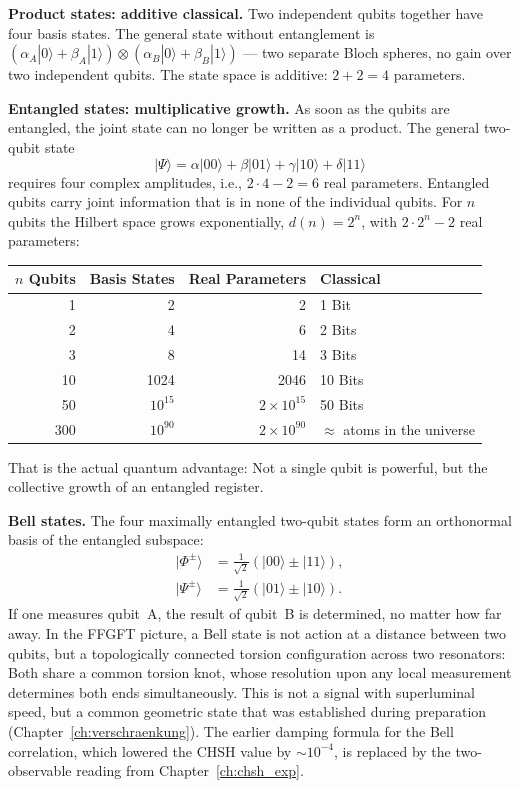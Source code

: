 \textbf{Product states: additive classical.} Two independent qubits
together have four basis states. The general state without
entanglement is $(\alpha_A|0\rangle+\beta_A|1\rangle)\otimes
(\alpha_B|0\rangle+\beta_B|1\rangle)$ --- two separate Bloch spheres,
no gain over two independent qubits. The state space is additive:
$2+2 = 4$ parameters.

\textbf{Entangled states: multiplicative growth.} As soon as the
qubits are entangled, the joint state can no longer be written as a
product. The general two-qubit state
\begin{equation}
  |\Psi\rangle = \alpha|00\rangle+\beta|01\rangle+\gamma|10\rangle+\delta|11\rangle
\end{equation}
requires four complex amplitudes, i.e., $2\cdot4-2 = 6$ real parameters.
Entangled qubits carry joint information that is in none of the
individual qubits. For $n$ qubits the Hilbert space grows exponentially,
$d(n) = 2^n$, with $2\cdot2^n-2$ real parameters:

\begin{center}
\small
\begin{tabular}{rrrl}
\toprule
$n$ Qubits & Basis States & Real Parameters & Classical \\
\midrule
1 & 2 & 2 & 1 Bit \\
2 & 4 & 6 & 2 Bits \\
3 & 8 & 14 & 3 Bits \\
10 & 1024 & 2046 & 10 Bits \\
50 & $10^{15}$ & $2\times10^{15}$ & 50 Bits \\
300 & $10^{90}$ & $2\times10^{90}$ & $\approx$ atoms in the universe \\
\bottomrule
\end{tabular}
\end{center}

That is the actual quantum advantage: Not a single qubit is
powerful, but the collective growth of an entangled register.

\textbf{Bell states.} The four maximally entangled
two-qubit states form an orthonormal basis of the entangled
subspace:
\begin{align}
  |\Phi^\pm\rangle &= \tfrac{1}{\sqrt2}(|00\rangle\pm|11\rangle),\\
  |\Psi^\pm\rangle &= \tfrac{1}{\sqrt2}(|01\rangle\pm|10\rangle).
\end{align}
If one measures qubit~A, the result of qubit~B is determined, no matter how
far away. In the FFGFT picture, a Bell state is not action at a distance
between two qubits, but a topologically connected
torsion configuration across two resonators: Both share a
common torsion knot, whose resolution upon any local measurement determines
both ends simultaneously. This is not a signal with
superluminal speed, but a common geometric state
that was established during preparation (Chapter~\ref{ch:verschraenkung}).
The earlier damping formula for the Bell correlation, which lowered the CHSH value
by $\sim10^{-4}$, is replaced by the two-observable reading from
Chapter~\ref{ch:chsh_exp}.

